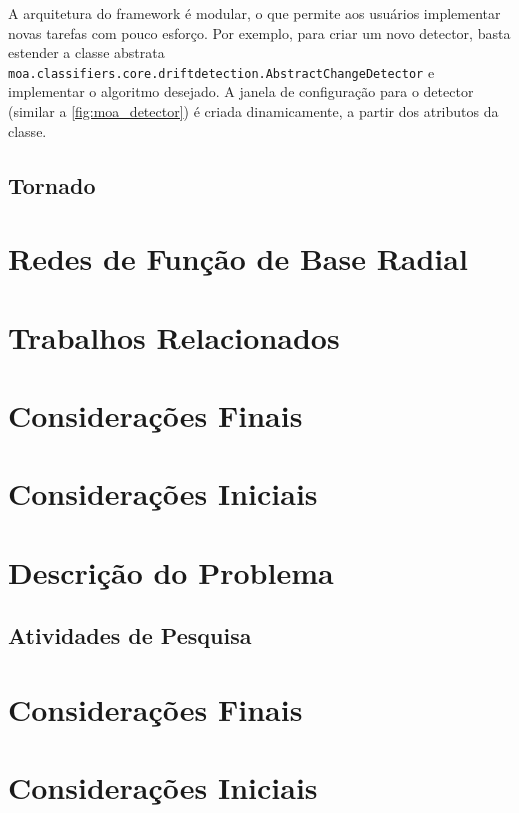 \documentclass[qual, classic, a4paper]{ufbathesis}
\begin{document}
A arquitetura do framework é modular, o que permite aos usuários implementar novas tarefas com pouco esforço.
Por exemplo, para criar um novo detector, basta estender a classe abstrata \texttt{moa.classifiers.core.driftdetection.AbstractChangeDetector} e implementar o algoritmo desejado.
A janela de configuração para o detector (similar a \ref{fig:moa_detector}) é criada dinamicamente, a partir dos atributos da classe.

\subsection{Tornado}
\blindtext

\section{Redes de Função de Base Radial}
\blindtext
  
\section{Trabalhos Relacionados}
\blindtext

\section{Considerações Finais}
\blindtext

 \label{plano_pesquisa}
\section{Considerações Iniciais}
\blindtext

\section{Descrição do Problema}
\blindtext

\subsection{Atividades de Pesquisa}
\blindtext

\section{Considerações Finais}
\blindtext

 \label{experimentos_iniciais}
\section{Considerações Iniciais}
\blindtext
\end{document}
